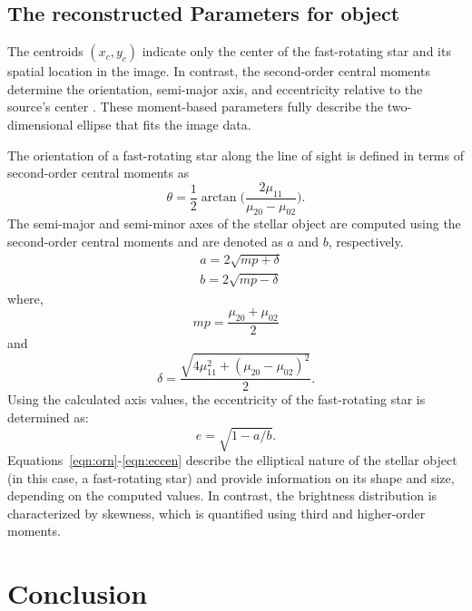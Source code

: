 \documentclass[fleqn,usenatbib,twocolumn]{mnras}
\providecommand{\DIFaddbegin}{} %
\providecommand{\DIFaddend}{} %
\newcommand{\DIFaddincludegraphics}[2][]{{\color{blue}\fbox{\DIFOincludegraphics[#1]{#2}}}} %
\DeclareRobustCommand{\DIFaddbegin}{\DIFOaddbegin \let\includegraphics\DIFaddincludegraphics} %
\DeclareRobustCommand{\DIFaddend}{\DIFOaddend \let\includegraphics\DIFOincludegraphics} %
\begin{document}
\subsection{The reconstructed Parameters for object}
The centroids \((x_c, y_c)\) indicate only the center of the fast-rotating star and its spatial location in the image. In contrast, the second-order central moments determine the orientation, semi-major axis, and eccentricity relative to the source's center \citep{teague1980image}. These moment-based parameters fully describe the two-dimensional ellipse that fits the image data.

The orientation of a fast-rotating star along the line of sight is defined in terms of second-order central moments as
\begin{equation}
	\theta = \frac{1}{2}\arctan \big(\frac{2\mu_{11}}{\mu_{20} - \mu_{02}}\big).
	\label{eqn:orn}
\end{equation}
The semi-major and semi-minor axes of the stellar object are computed using the second-order central moments and are denoted as \(a\) and \(b\), respectively.
\begin{equation}
	\begin{aligned}
		&a = 2\sqrt{mp + \delta} \\
		&b = 2\sqrt{mp - \delta}
	\end{aligned}
	\label{eqn:semi}
\end{equation}
where,
\begin{equation}
	mp = \frac{\mu_{20} + \mu_{02}}{2}
	\label{eqn:mp}
\end{equation}
and
\begin{equation}
	\delta = \frac{\sqrt{4\mu_{11}^2 + (\mu_{20} - \mu_{02})^2}}{2}.	
	\label{eqn:delta}
\end{equation}
Using the calculated axis values, the eccentricity of the fast-rotating star is determined as:
\begin{equation}
	e = \sqrt{1 - a/b}.
	\label{eqn:eccen}
\end{equation}
Equations~\ref{eqn:orn}-\ref{eqn:eccen} describe the elliptical nature of the stellar object (in this case, a fast-rotating star) and provide information on its shape and size, depending on the computed values. In contrast, the brightness distribution is characterized by skewness, which is quantified using third and higher-order moments.
\DIFaddbegin 

\DIFaddend \section{Conclusion}
\DIFaddbegin 
\end{document}
